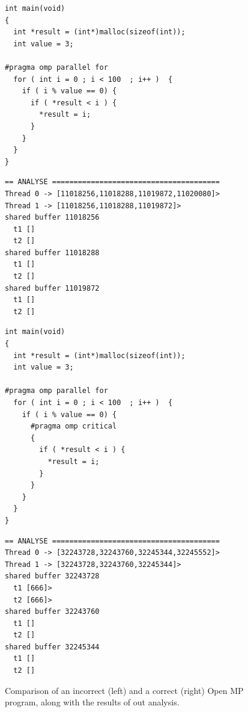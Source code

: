 \begin{figure}
  \centering
  \lstset{language=C, basicstyle=\small}

  \begin{minipage}{.45\textwidth}
    \begin{lstlisting}
int main(void) 
{
  int *result = (int*)malloc(sizeof(int));
  int value = 3;
  
#pragma omp parallel for 
  for ( int i = 0 ; i < 100  ; i++ )  {
    if ( i % value == 0) {
      if ( *result < i ) {
        *result = i;
      }
    }
  }
}
    \end{lstlisting}
    \vspace{8mm}
    \lstset{basicstyle=\scriptsize}
    \begin{lstlisting}
== ANALYSE =======================================
Thread 0 -> [11018256,11018288,11019872,11020080]>
Thread 1 -> [11018256,11018288,11019872]>
shared buffer 11018256
  t1 []
  t2 []
shared buffer 11018288
  t1 []
  t2 []
shared buffer 11019872
  t1 []
  t2 []
    \end{lstlisting}
  \end{minipage}
  \hspace{.025\textwidth}
  \hspace{.025\textwidth}
  \begin{minipage}{.45\textwidth}
    \begin{lstlisting}
int main(void) 
{
  int *result = (int*)malloc(sizeof(int));
  int value = 3;
  
#pragma omp parallel for 
  for ( int i = 0 ; i < 100  ; i++ )  {
    if ( i % value == 0) {
      #pragma omp critical 
      {
        if ( *result < i ) {
          *result = i;
        }
      }
    }
  }
}
    \end{lstlisting}
    \lstset{basicstyle=\scriptsize}
    \begin{lstlisting}
== ANALYSE =======================================
Thread 0 -> [32243728,32243760,32245344,32245552]>
Thread 1 -> [32243728,32243760,32245344]>
shared buffer 32243728
  t1 [666]>
  t2 [666]>
shared buffer 32243760
  t1 []
  t2 []
shared buffer 32245344
  t1 []
  t2 []
    \end{lstlisting}
  \end{minipage}
  \caption{Comparison of an incorrect (left) and a correct (right)
    Open MP program, along with the results of out analysis.}
  \label{fig:openmp}
\end{figure}



